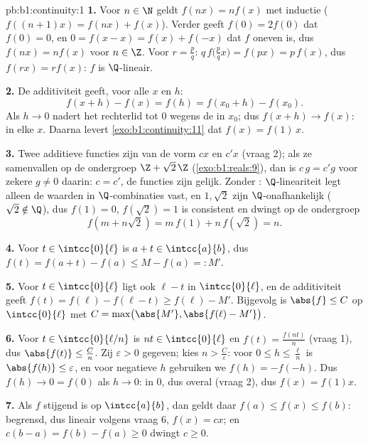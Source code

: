 \begin{solution}{pb:b1:continuity:1}
\textbf{1.} Voor $n \in \N$ geldt $f(nx) = n f(x)$ met inductie
($f((n+1)x) = f(nx) + f(x)$). Verder geeft $f(0) = 2f(0)$ dat $f(0)
= 0$, en $0 = f(x - x) = f(x) + f(-x)$ dat $f$ oneven is, dus $f(nx)
= nf(x)$ voor $n \in \Z$. Voor $r = \frac pq$: $q\,f\bigl(\tfrac
pq x\bigr) = f(px) = p\,f(x)$, dus $f(rx) = r f(x)$: $f$ is
$\Q$-lineair.

\textbf{2.} De additiviteit geeft, voor alle $x$ en $h$:
\[
f(x + h) - f(x) = f(h) = f(x_0 + h) - f(x_0) .
\]
Als $h \to 0$ nadert het rechterlid tot $0$ wegens de 
in $x_0$; dus $f(x + h) \to f(x)$:  in elke $x$. Daarna
levert \cref{exo:b1:continuity:11} dat $f(x) = f(1)\,x$.

\textbf{3.} Twee  additieve functies zijn van de vorm $cx$
en $c'x$ (vraag 2); als ze samenvallen op de  ondergroep $\Z +
\sqrt2\,\Z$ (\cref{exo:b1:reals:9}), dan is $c\,g = c'g$ voor zekere
$g \neq 0$ daarin: $c = c'$, de functies zijn gelijk. Zonder
: $\Q$-lineariteit legt alleen de waarden in
$\Q$-combinaties vast, en $1, \sqrt2$ zijn $\Q$-onafhankelijk
($\sqrt2 \notin \Q$), dus $f(1) = 0$, $f(\sqrt2) = 1$ is consistent
en dwingt op de ondergroep
\[
f(m + n\sqrt2) = m\,f(1) + n\,f(\sqrt2) = n .
\]

\textbf{4.} Voor $t \in \intcc{0}{\ell}$ is $a + t \in
\intcc{a}{b}$, dus $f(t) = f(a + t) - f(a) \leq M - f(a) =: M'$.

\textbf{5.} Voor $t \in \intcc{0}{\ell}$ ligt ook $\ell - t$ in
$\intcc{0}{\ell}$, en de additiviteit geeft $f(t) = f(\ell) -
f(\ell - t) \geq f(\ell) - M'$. Bijgevolg is $\abs{f} \leq C$ op
$\intcc{0}{\ell}$ met $C = \max\bigl(\abs{M'}, \abs{f(\ell) -
M'}\bigr)$.

\textbf{6.} Voor $t \in \intcc{0}{\ell/n}$ is $nt \in
\intcc{0}{\ell}$ en $f(t) = \frac{f(nt)}{n}$ (vraag 1), dus
$\abs{f(t)} \leq \frac Cn$. Zij $\varepsilon > 0$ gegeven; kies $n >
\frac C\varepsilon$: voor $0 \leq h \leq \frac\ell n$ is
$\abs{f(h)} \leq \varepsilon$, en voor negatieve $h$ gebruiken we
$f(h) = -f(-h)$. Dus $f(h) \to 0 = f(0)$ als $h \to 0$:
 in $0$, dus overal (vraag 2), dus $f(x) = f(1)x$.

\textbf{7.} Als $f$ stijgend is op $\intcc{a}{b}$, dan geldt daar
$f(a) \leq f(x) \leq f(b)$: begrensd, dus lineair volgens vraag 6,
$f(x) = cx$; en $c(b - a) = f(b) - f(a) \geq 0$ dwingt $c \geq 0$.


\end{solution}

